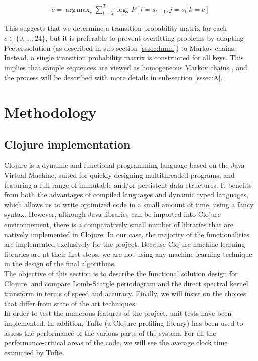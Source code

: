 \documentclass[letterpaper]{article}
\DeclareMathOperator*{\argmax}{arg\,max}
\begin{document}
\begin{align}
\hat{c} = \argmax_c \sum_{t=2}^{T} \log_2 P[i=s_{t-1}, j=s_{t} | k = c]
\label{logproba}
\end{align}

This suggests that we determine a transition probability matrix for each $c \in \{0, ..., 24\}$, but it is preferable to prevent overfitting problems by adapting Peeters\textquotesingle solution (as described in sub-section \ref{sssec:hmm}) to Markov chains. Instead, a single transition probability matrix is constructed for all keys. This implies that sample sequences are viewed as homogeneous Markov chains \citep{AUTOMATA}, and the process will be described with more details in sub-section \ref{sssec:A}.

\section{Methodology}


\subsection{Clojure implementation}

Clojure is a dynamic and functional programming language based on the Java Virtual Machine, suited for quickly designing multithreaded programs,
and featuring a full range of immutable and/or persistent data structures. It benefits from both the advantages of compiled languages and dynamic typed
languages, which allows us to write optimized code in a small amount of time, using a fancy syntax. However, although Java libraries can be imported into Clojure environnement, there is a comparatively small number of libraries that are natively implemented in Clojure. In our case, the majority of the functionalities
are implemented exclusively for the project. Because Clojure machine learning libraries are at their first steps, we are not using any machine learning 
technique in the design of the final algorithms.\\

The objective of this section is to describe the functional solution design for Clojure, and compare Lomb-Scargle periodogram and the direct spectral kernel
transform in terms of speed and accuracy. Finally, we will insist on the choices that differ from state of the art techniques.\\

In order to test the numerous features of the project, unit tests have been implemented. In addition, Tufte (a Clojure profiling library) has been used to assess the performance of the various parts of the system. For all the performance-critical areas of the code, we will see the average clock time estimated by Tufte.\\
\end{document}
